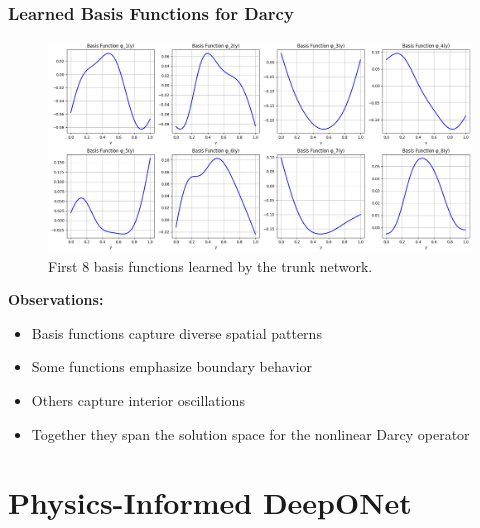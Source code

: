 \documentclass[notes]{beamer}
\begin{document}
\begin{frame}
\frametitle{Learned Basis Functions for Darcy}

\begin{figure}[ht]
	\centering
	\includegraphics[width=\textwidth]{figs/darcy_basis_functions.png}
	\caption*{First 8 basis functions learned by the trunk network.}
\end{figure}

\textbf{Observations:}
\begin{itemize}
    \item Basis functions capture diverse spatial patterns
    \item Some functions emphasize boundary behavior
    \item Others capture interior oscillations
    \item Together they span the solution space for the nonlinear Darcy operator
\end{itemize}

\end{frame}

\section{Physics-Informed DeepONet}
\end{document}
